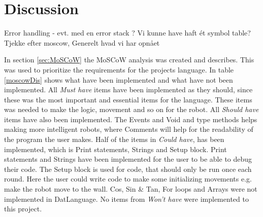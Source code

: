 \chapter{Discussion}
\label{chap:Discussion}

Error handling - evt. med en error stack ?
Vi kunne have haft ét symbol table?
Tjekke efter moscow,
Generelt hvad vi har opnået


In section \ref{sec:MoSCoW} the MoSCoW analysis was created and describes. This was used to prioritize the requirements for the projects language. In table \ref{moscowDis} shows what have been implemented and what have not been implemented. \newline
All \textit{Must have} items have been implemented as they should, since these was the most important and essential items for the language. These items was needed to make the logic, movement and so on for the robot. \newline
All \textit{Should have} items have also been implemented. The Events and Void and type methods helps making more intelligent robots, where Comments will help for the readability of the program the user makes. \newline
Half of the items in \textit{Could have}, has been implemented, which is Print statements, Strings and Setup block. Print statements and Strings have been implemented for the user to be able to debug their code. The Setup block is used for code, that should only be run once each round. Here the user could write code to make some initializing movements e.g. make the  robot move to the wall. Cos, Sin \& Tan, For loops and Arrays were not implemented in DatLanguage. \newline
No items from \textit{Won't have} were implemented to this project.

